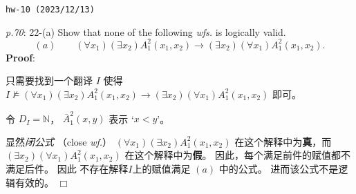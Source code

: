 \documentclass[UTF8,12pt,a4paper]{ctexart}
\begin{document}
\noindent\texttt{hw-10 (2023/12/13)}

\emph{p.70}: 22-(a) \quad
Show that none of the following \textit{wfs.} is logically valid.
\[
(a) \qquad 
(\forall x_1) (\exists x_2) A^2_1(x_1,x_2) \to (\exists x_2) (\forall x_1) A^2_1 (x_1,x_2).
\]
\textbf{Proof}:   

只需要找到一个翻译 $I$ 使得 $I \not \models (\forall x_1) (\exists x_2) A^2_1(x_1,x_2) \to (\exists x_2) (\forall x_1) A^2_1 (x_1,x_2)$ 即可。

令 $D_I=\mathbb{N}$， $\bar{A}^2_1(x,y)$ 表示 `$x < y$'。


显然\textit{闭公式}  （close \textit{wf.}） $(\forall x_1) (\exists x_2) A^2_1(x_1,x_2)$ 在这个解释中为\textbf{真}，而 
$(\exists x_2) (\forall x_1) A^2_1 (x_1,x_2)$ 在这个解释中为\textbf{假}。
因此，每个满足前件的赋值都不满足后件。
因此 不存在解释$I$上的赋值满足 $(a)$ 中的公式。
进而该公式不是逻辑有效的。 
\hfill $\Box$







\end{document}
